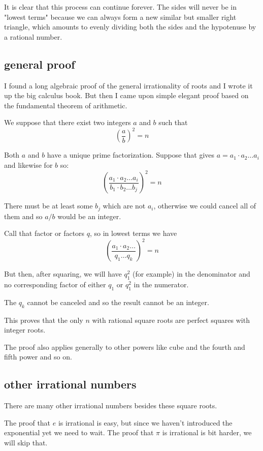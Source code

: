 \documentclass[11pt, oneside]{article}
\begin{document}
It is clear that this process can continue forever.  The sides will never be in "lowest terms" because we can always form a new similar but smaller right triangle, which amounts to evenly dividing both the sides and the hypotenuse by a rational number.

\subsection*{general proof}

I found a long algebraic proof of the general irrationality of roots and I wrote it up the big calculus book.  But then I came upon simple elegant proof based on the fundamental theorem of arithmetic.

We suppose that there exist two integers $a$ and $b$ such that 
\[ (\frac{a}{b})^2 = n \]

Both $a$ and $b$ have a unique prime factorization.  Suppose that gives $a = a_1 \cdot a_2 \dots a_i$ and likewise for $b$ so:
\[ (\frac{a_1 \cdot a_2 \dots a_i}{b_1 \cdot b_2 \dots b_j})^2 = n \]

There must be at least some $b_j$ which are not $a_i$, otherwise we could cancel all of them and so $a/b$ would be an integer.

Call that factor or factors $q$, so in lowest terms we have
\[ (\frac{a_1 \cdot a_2 \dots }{q_1 \dots q_k})^2 = n \]

But then, after squaring, we will have $q_1^2$ (for example) in the denominator and no corresponding factor of either $q_1$ or $q_1^2$ in the numerator.  

The $q_k$ cannot be canceled and so the result cannot be an integer.

This proves that the only $n$ with rational square roots are perfect squares with integer roots.

The proof also applies generally to other powers like cube and the fourth and fifth power and so on.

\subsection*{other irrational numbers}

There are many other irrational numbers besides these square roots.  

The proof that $e$ is irrational is easy, but since we haven't introduced the exponential yet we need to wait.  The proof that $\pi$ is irrational is bit harder, we will skip that.
\end{document}
